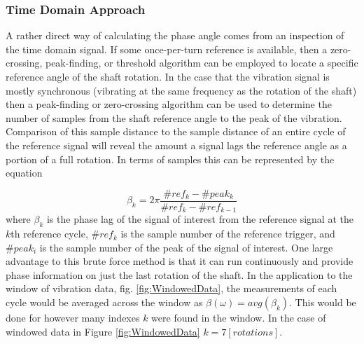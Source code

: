 \subsubsection{Time Domain Approach}
A rather direct way of calculating the phase angle comes from an inspection of the time domain signal. If some once-per-turn reference is available, then a zero-crossing, peak-finding, or threshold algorithm can be employed to locate a specific reference angle of the shaft rotation. In the case that the vibration signal is mostly synchronous (vibrating at the same frequency as the rotation of the shaft) then a peak-finding or zero-crossing algorithm can be used to determine the number of samples from the shaft reference angle to the peak of the vibration. Comparison of this sample distance to the sample distance of an entire cycle of the reference signal will reveal the amount a signal lags the reference angle as a portion of a full rotation. In terms of samples this can be represented by the equation\par 
\begin{equation}\label{eq:PhaseAngleTimeDomain}
\beta_k = 2\pi\frac{\#ref_k-\#peak_k}{\#ref_k-\#ref_{k-1}}
\end{equation}
where $ \beta_k $ is the phase lag of the signal of interest from the reference signal at the $ k $th reference cycle, $ \#ref_k $ is the sample number of the reference trigger, and $ \#peak_i $ is the sample number of the peak of the signal of interest. One large advantage to this brute force method is that it can run continuously and provide phase information on just the last rotation of the shaft. In the application to the window of vibration data, fig. \ref{fig:WindowedData}, the measurements of each cycle would be averaged across the window as $ \beta(\omega)=avg(\beta_k) $. This would be done for however many indexes $ k $ were found in the window. In the case of windowed data in Figure \ref{fig:WindowedData} $ k=7[rotations] $.\par 
